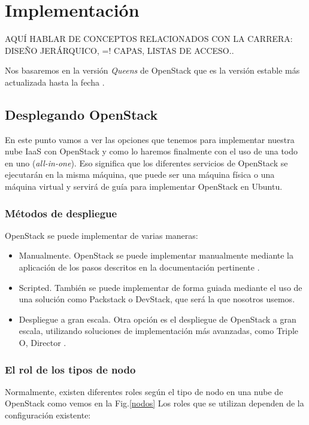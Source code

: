 \chapter{Implementación} \label{chap:implementacion}
\begin{tcolorbox}[colback=red!5!white,colframe=red!75!black]
AQUÍ HABLAR DE CONCEPTOS RELACIONADOS CON LA CARRERA: DISEÑO JERÁRQUICO, =! CAPAS, LISTAS DE ACCESO..
\end{tcolorbox}

Nos basaremos en la versión\textit{ Queens }de OpenStack que es la versión estable más actualizada hasta la fecha \cite{noauthor_releases:_nodate}.

\section{Desplegando OpenStack}
En este punto vamos a ver las opciones que tenemos para implementar nuestra nube IaaS con OpenStack y como lo haremos finalmente con el uso de una todo en uno (\textit{all-in-one}). Eso significa que  los diferentes servicios de OpenStack se ejecutarán en la misma máquina, que puede ser una máquina física o una máquina virtual y servirá de guía para implementar OpenStack en Ubuntu.

\subsection{Métodos de despliegue}\label{subsesc:metodosdespliegue}
OpenStack se puede implementar de varias maneras:

\begin{itemize}
\item Manualmente. OpenStack se puede implementar manualmente mediante la aplicación de los pasos descritos en la documentación pertinente \cite{noauthor_install_nodate}.
\item Scripted. También se puede implementar de forma guiada mediante el uso de una solución como Packstack o DevStack, que será la que nosotros usemos.
\item Despliegue a gran escala. Otra opción es el despliegue de OpenStack a gran escala, utilizando soluciones de implementación más avanzadas, como Triple O, Director \cite{noauthor_tripleo_nodate}\cite{noauthor_director_nodate}.
\end{itemize}

\subsection{El rol de los tipos de nodo}\label{subchap:rol-nodos}
Normalmente, existen diferentes roles según el tipo de nodo en una nube de OpenStack como vemos en la Fig.\ref{nodos} Los roles que se utilizan dependen de la configuración existente:

